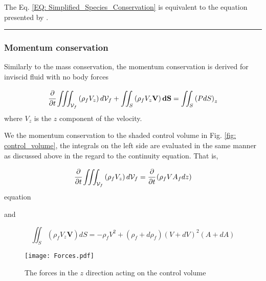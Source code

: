 \documentclass[../Parameter_fitting.tex]{subfiles}
\begin{document}
	The Eq. \ref{EQ: Simplified_Species_Conservation} is equivalent to the equation presented by \citet{Reverchon1996}.
	
	\hrule
	
	\subsubsection{Momentum conservation}
	
	Similarly to the mass conservation, the momentum conservation is derived for inviscid fluid with no body forces
	
	{\footnotesize
		\begin{equation}
			\cfrac{\partial}{\partial t} \iiint_{\mathcal{V}_f} \left( \rho_f V_z \right) d\mathcal{V}_f + \iint_S \left( \rho_f V_z \textbf{V} \right) \textbf{dS} = \iint_S \left( P dS \right)_z
			\label{EQ: Momentum_Integral_Form}
		\end{equation}
	}
	where $V_z$ is the $z$ component of the velocity.

	We the momentum conservation to the shaded control volume in Fig. \ref{fig: control_volume}, the integrals on the left side are evaluated in the same manner as discussed above in the regard to the continuity equation. That is,
	
	{\footnotesize
		\begin{equation}
			\cfrac{\partial}{\partial t} \iiint_{\mathcal{V}_f} \left( \rho_f V_z \right) d \mathcal{V}_f = \cfrac{\partial}{\partial t} \left( \rho_f V A_f dz \right)
			\label{EQ: Force_Continuity_Monenmtum}
		\end{equation}equation
	}
	
	and 
	
	{\footnotesize
		\begin{equation}
			\iint_S \left( \rho_f V_z \textbf{V} \right) dS = -\rho_f V^2 + \left( \rho_f + d \rho_f \right) \left( V+dV \right)^2 \left( A+dA \right)
		\end{equation}
	}
	
	\begin{figure}[h]
		\centering
		\texttt{[image: Forces.pdf]}
		\caption{The forces in the $z$ direction acting on the control volume}
		\label{fig: Forces_Momentum_Control_Volume}
	\end{figure}
	
\end{document}
